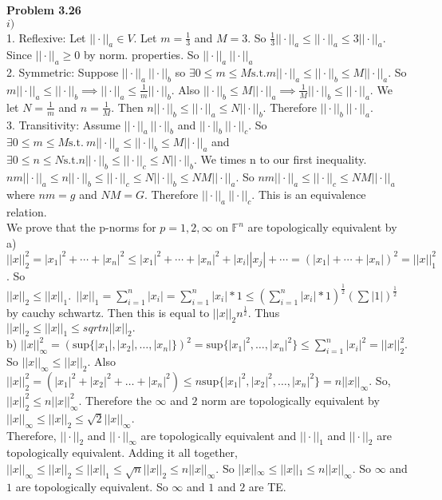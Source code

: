 \documentclass[letterpaper,12pt]{article}
\theoremstyle{definition}
\begin{document}
 \noindent\textbf{Problem 3.26} \\
 $i)$ \\
 1. Reflexive: Let $|| \cdot||_a \in V$.  Let $m = \frac{1}{3}$ and $M = 3$. So $\frac{1}{3}||\cdot||_a \leq ||\cdot||_a \leq 3||\cdot||_a$.  Since $||\cdot||_a \geq 0$ by norm. properties. So $||\cdot||_a ~ ||\cdot||_a$\\
 2. Symmetric: Suppose $||\cdot||_a ~ ||\cdot||_b$ so $\exists 0 \leq m \leq M \mathrm{s.t.}  m||\cdot||_a \leq ||\cdot||_b \leq M||\cdot||_a$.  So $m||\cdot||_a \leq ||\cdot||_b \implies ||\cdot||_a \leq \frac{1}{m}||\cdot||_b$.  Also $||\cdot||_b \leq M||\cdot||_a \implies \frac{1}{M}||\cdot||_b \leq ||\cdot||_a$. We let $N=\frac{1}{m}$ and $n=\frac{1}{M}$.  Then $n||\cdot||_b \leq ||\cdot||_a \leq N||\cdot||_b$.  Therefore $||\cdot||_b ~ ||\cdot||_a$.\\
 3. Transitivity: Assume $||\cdot||_a ~ ||\cdot||_b$ and $||\cdot||_b ~ ||\cdot||_c$.  So $\exists 0 \leq m \leq M \mathrm{s.t.}  \: m||\cdot||_a \leq ||\cdot||_b \leq M||\cdot||_a$ and $\exists 0 \leq n \leq N \mathrm{s.t.} n||\cdot||_b \leq ||\cdot||_c \leq N||\cdot||_b$.  We times n to our first inequality.  $nm||\cdot||_a \leq n||\cdot||_b \leq ||\cdot||_c \leq N||\cdot||_b \leq NM||\cdot||_a$.  So $nm||\cdot||_a \leq ||\cdot||_c \leq NM||\cdot||_a$ where $nm = g$ and $NM = G$.  Therefore $||\cdot||_a ~ ||\cdot||_c$.  This is an equivalence relation.\\
 We prove that the p-norms for $p=1, 2, \infty$ on $\mathbb{F}^n$ are topologically equivalent by\\
 a) $||x||_2^2 = |x_1|^2 + \cdots + |x_n|^2 \leq |x_1|^2 + \cdots + |x_n|^2 + |x_i||x_j| + \cdots = (|x_1| + \cdots + |x_n|)^2 = ||x||_1^2$.  So $||x||_2 \leq ||x||_1. \:\: ||x||_1 = \sum^n_{i=1}|x_i| = \sum^n_{i=1}|x_i|*1 \leq (\sum^n_{i=1}|x_i|*1)^{\frac{1}{2}}(\sum |1|)^{\frac{1}{2}}$ by cauchy schwartz.  Then this is equal to $||x||_2n^{\frac{1}{2}}$.  Thus $||x||_2 \leq ||x||_1 \leq sqrt{n}||x||_2.$\\
 b) $||x||_{\infty}^2 = (\mathrm{sup}\{ |x_1|, |x_2|, \dots, |x_n| \})^2 = \mathrm{sup} \{|x_1|^2, \dots, |x_n|^2\} \leq \sum_{i=1}^n |x_i|^2 = ||x||_2^2$.  So $||x||_{\infty} \leq ||x||_2$.  Also $||x||_2^2 = (|x_1|^2 + |x_2|^2 + \dots + |x_n|^2) \leq n\mathrm{sup} \{|x_1|^2, |x_2|^2, \dots,|x_n|^2\} = n||x||_{\infty}$.  So, $||x||_2^2 \leq n||x||_{\infty}^2$.  Therefore the $\infty$ and $2$ norm are topologically equivalent by $||x||_{\infty} \leq ||x||_2 \leq \sqrt{2}||x||_{\infty}$.  \\
 Therefore, $||\cdot||_2$ and $||\cdot||_{\infty}$ are topologically equivalent and $||\cdot||_1$ and $||\cdot||_2$ are topologically equivalent.  Adding it all together, $||x||_{\infty} \leq ||x||_2 \leq ||x||_1 \leq \sqrt{n}||x||_2 \leq n||x||_{\infty}$.  So |$|x||_{\infty} \leq ||x||_1 \leq n||x||_{\infty}$.  So $\infty$ and $1$ are topologically equivalent.  So $\infty$ and $1$ and $2$ are TE.\\
 
\end{document}
